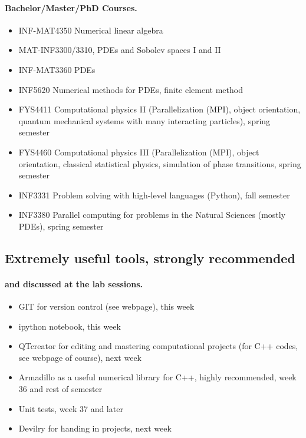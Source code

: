\documentclass[%
oneside,                 %
final,                   %
10pt]{article}
\begin{document}
\paragraph{Bachelor/Master/PhD Courses.}
\begin{itemize}
  \item INF-MAT4350 Numerical linear algebra

  \item MAT-INF3300/3310, PDEs and Sobolev spaces I and II

  \item INF-MAT3360 PDEs

  \item INF5620 Numerical methods for PDEs, finite element method

  \item FYS4411 Computational physics II (Parallelization (MPI), object orientation, quantum mechanical systems with many interacting particles), spring semester

  \item FYS4460 Computational physics III (Parallelization (MPI), object orientation, classical statistical physics, simulation of phase transitions, spring semester

  \item INF3331 Problem solving with high-level languages (Python), fall semester

  \item INF3380 Parallel computing for problems in the Natural Sciences (mostly PDEs), spring semester
\end{itemize}

\noindent




\subsection{Extremely useful tools, strongly recommended}


\paragraph{and discussed at the lab sessions.}
\begin{itemize}
  \item GIT for version control (see webpage), this week

  \item ipython notebook, this week

  \item QTcreator for editing and mastering computational projects (for C++ codes, see webpage of course), next week

  \item Armadillo as a useful numerical library for C++, highly recommended, week 36 and rest of semester

  \item Unit tests, week 37 and later

  \item Devilry for handing in projects, next week
\end{itemize}

\noindent






\printindex
\end{document}

